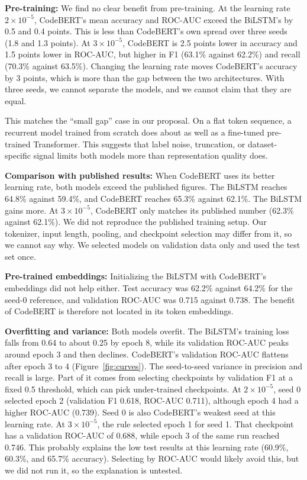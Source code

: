\documentclass{article}
\begin{document}
\textbf{Pre-training:}
We find no clear benefit from pre-training. At the learning rate $2\times10^{-5}$, CodeBERT's mean accuracy and ROC-AUC exceed the BiLSTM's by 0.5 and 0.4 points. This is less than CodeBERT's own spread over three seeds (1.8 and 1.3 points).
At $3\times10^{-5}$, CodeBERT is 2.5 points lower in accuracy and 1.5 points lower in ROC-AUC, but higher in F1 (63.1\% against 62.2\%) and recall (70.3\% against 63.5\%). Changing the learning rate moves CodeBERT's accuracy by 3 points, which is more than the gap between the two architectures.
With three seeds, we cannot separate the models, and we cannot claim that they are equal.

This matches the ``small gap'' case in our proposal. On a flat token sequence, a recurrent model trained from scratch does about as well as a fine-tuned pre-trained Transformer. This suggests that label noise, truncation, or dataset-specific signal limits both models more than representation quality does.

\textbf{Comparison with published results:}
When CodeBERT uses its better learning rate, both models exceed the published figures. The BiLSTM reaches 64.8\% against 59.4\%, and CodeBERT reaches 65.3\% against 62.1\%. The BiLSTM gains more. At $3\times10^{-5}$, CodeBERT only matches its published number (62.3\% against 62.1\%).
We did not reproduce the published training setup. Our tokenizer, input length, pooling, and checkpoint selection may differ from it, so we cannot say why. We selected models on validation data only and used the test set once.

\textbf{Pre-trained embeddings:}
Initializing the BiLSTM with CodeBERT's embeddings did not help either. Test accuracy was 62.2\% against 64.2\% for the seed-0 reference, and validation ROC-AUC was 0.715 against 0.738. The benefit of CodeBERT is therefore not located in its token embeddings.

\textbf{Overfitting and variance:}
Both models overfit. The BiLSTM's training loss falls from 0.64 to about 0.25 by epoch 8, while its validation ROC-AUC peaks around epoch 3 and then declines. CodeBERT's validation ROC-AUC flattens after epoch 3 to 4 (Figure~\ref{fig:curves}).
The seed-to-seed variance in precision and recall is large. Part of it comes from selecting checkpoints by validation F1 at a fixed 0.5 threshold, which can pick under-trained checkpoints. At $2\times10^{-5}$, seed 0 selected epoch 2 (validation F1 0.618, ROC-AUC 0.711), although epoch 4 had a higher ROC-AUC (0.739). Seed 0 is also CodeBERT's weakest seed at this learning rate.
At $3\times10^{-5}$, the rule selected epoch 1 for seed 1. That checkpoint has a validation ROC-AUC of 0.688, while epoch 3 of the same run reached 0.746. This probably explains the low test results at this learning rate (60.9\%, 60.3\%, and 65.7\% accuracy). Selecting by ROC-AUC would likely avoid this, but we did not run it, so the explanation is untested.
\end{document}
